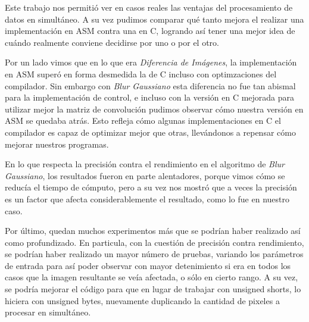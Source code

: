 Este trabajo nos permitió ver en casos reales las ventajas del procesamiento de
datos en simultáneo. A su vez pudimos comparar qué tanto mejora el realizar una
implementación en ASM contra una en C, logrando así tener una mejor idea de
cuándo realmente conviene decidirse por uno o por el otro.

Por un lado vimos que en lo que era \textit{Diferencia de Imágenes}, la
implementación en ASM superó en forma desmedida la de C incluso con
optimzaciones del compilador. Sin embargo con \textit{Blur Gaussiano} esta
diferencia no fue tan abismal para la implementación de control, e incluso con
la versión en C mejorada para utilizar mejor la matriz de convolución pudimos
observar cómo nuestra versión en ASM se quedaba atrás. Esto refleja cómo algunas
implementaciones en C el compilador es capaz de optimizar mejor que otras,
llevándonos a repensar cómo mejorar nuestros programas.

En lo que respecta la precisión contra el rendimiento en el algoritmo de
\textit{Blur Gaussiano}, los resultados fueron en parte alentadores, porque
vimos cómo se reducía el tiempo de cómputo, pero a su vez nos mostró que a veces
la precisión es un factor que afecta considerablemente el resultado, como lo fue
en nuestro caso.

Por último, quedan muchos experimentos más que se podrían haber realizado así
como profundizado. En particula, con la cuestión de precisión contra
rendimiento, se podrían haber realizado un mayor número de pruebas, variando los
parámetros de entrada para así poder observar con mayor detenimiento si era en
todos los casos que la imagen resultante se veía afectada, o sólo en cierto
rango. A su vez, se podría mejorar el código para que en lugar de trabajar con
unsigned shorts, lo hiciera con unsigned bytes, nuevamente duplicando la
cantidad de pixeles a procesar en simultáneo.

